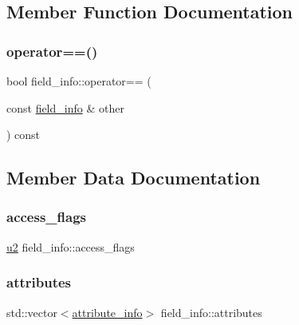 \subsection{Member Function Documentation}
\mbox{\label{structfield__info_a59e5c216711da95fa6a91aa1ca652257}} 
\subsubsection{\texorpdfstring{operator==()}{operator==()}}
{\footnotesize\ttfamily bool field\+\_\+info\+::operator== (\begin{DoxyParamCaption}\item[{const \hyperlink{structfield__info}{field\+\_\+info} \&}]{other }\end{DoxyParamCaption}) const}



\subsection{Member Data Documentation}
\mbox{\label{structfield__info_aa622dc9a5b5353d2f3eb2f416dacab4b}} 
\subsubsection{\texorpdfstring{access\+\_\+flags}{access\_flags}}
{\footnotesize\ttfamily \hyperlink{types_8h_ae676e9207f57fb921dca7366b2f59c53}{u2} field\+\_\+info\+::access\+\_\+flags}

\mbox{\label{structfield__info_adfe1d7d2b5a70e0c7a0204cb42cc68f0}} 
\subsubsection{\texorpdfstring{attributes}{attributes}}
{\footnotesize\ttfamily std\+::vector$<$\hyperlink{structattribute__info}{attribute\+\_\+info}$>$ field\+\_\+info\+::attributes}

